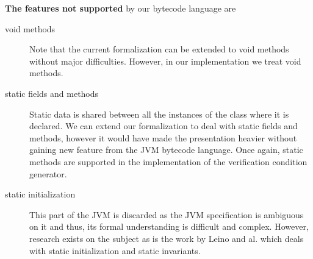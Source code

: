 \textbf{The features not supported} by our bytecode language are 
\begin{description} 
   \item[void methods]  Note that the current formalization can be extended to void methods without major difficulties.
         However, in our implementation  we treat void methods.

   \item [static fields and methods] Static data is shared between all the instances of the class
         where it is declared.  We can extend our formalization to deal with static fields and methods,
	 however it would have made the presentation heavier without gaining new feature from the JVM bytecode language. 
	 Once again, static methods are supported in the implementation of the verification condition generator.

   \item [static initialization]
         This part of the JVM is discarded as the JVM specification is ambiguous on it and 
	 thus, its formal understanding is difficult and complex.
	 However, research exists on the subject as is the  work by Leino and
	 al. \cite{krml153}  which deals with static initialization and  static invariants.


\end{description}
